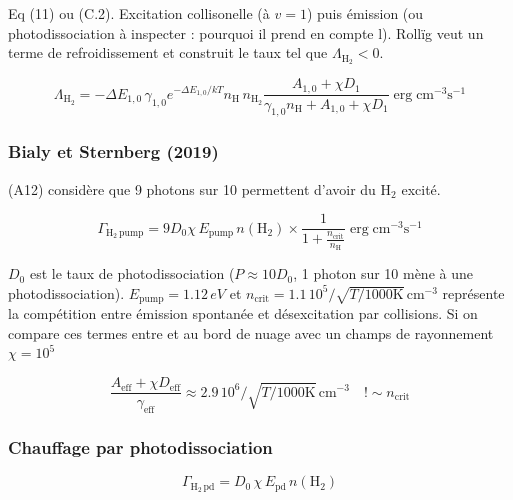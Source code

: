 Eq (11) ou (C.2).
Excitation collisonelle (à $v=1$) puis émission (ou photodissociation à inspecter : pourquoi il prend en compte l). Rollïg veut un terme de refroidissement et construit le taux tel que $\Lambda_{\mathrm{H}_2} < 0$.

\begin{equation}
    \Lambda_{\mathrm{H}_2} = - \Delta E_{1,0} \, \gamma_{1,0} e^{-\Delta E_{1,0}/kT} n_{\mathrm{H}} \, n_{\mathrm{H}_2} \frac{A_{1,0} + \chi D_1}{\gamma_{1,0}  n_{\mathrm{H}} + A_{1,0} + \chi D_1} \operatorname{erg} \mathrm{cm}^{-3} \mathrm{s}^{-1}
\end{equation}

\subsubsection{Bialy et Sternberg (2019)}

\cite{BialySternberg_2019} (A12) considère que 9 photons sur 10 permettent d'avoir du $\mathrm{H}_2$ excité. 

\begin{equation}
    \Gamma_{\mathrm{H}_2 \, \mathrm{pump}} = 9D_0 \chi \, E_{\mathrm{pump}} \, n(\mathrm{H}_2) \times \frac{1}{1 + \frac{n_{\mathrm{crit}}}{n_\mathrm{H}} } \operatorname{erg} \mathrm{cm}^{-3} \mathrm{s}^{-1}
\end{equation}

$D_0$ est le taux de photodissociation ($P \approx 10 D_0$, 1 photon sur 10 mène à une photodissociation). $E_{\mathrm{pump}} = 1.12\,eV$ et $n_{\mathrm{crit}} = 1.1\,10^5 /\sqrt{T/1000\mathrm{K}} \, \mathrm{cm}^{-3}$ représente la compétition entre émission spontanée et désexcitation par collisions. Si on compare ces termes entre \cite{BialySternberg_2019} et \cite{Rollig2005} au bord de nuage avec un champs de rayonnement $\chi = 10^5 $

\begin{equation}
    \frac{A_{\text{eff}}+ \chi D_{\text{eff}}}{\gamma_{\text{eff}}} \approx 2.9\,10^{6} /\sqrt{T/1000\mathrm{K}} \, \mathrm{cm}^{-3} \quad !\sim n_{\mathrm{crit}}
\end{equation}

\subsubsection{Chauffage par photodissociation}

\begin{equation}
    \Gamma_{\mathrm{H}_2 \, \mathrm{pd}} = D_0\,\chi \, E_\mathrm{pd} \, n(\mathrm{H}_2)
\end{equation}

